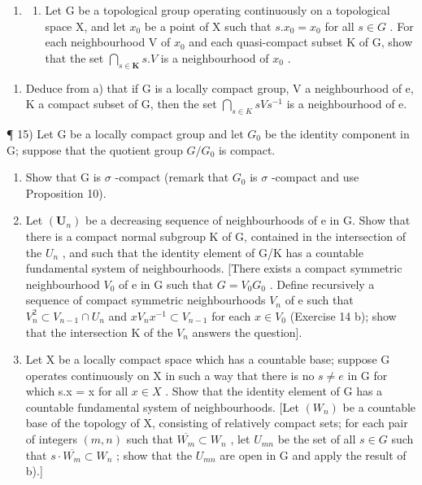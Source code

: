 \begin{enumerate}
\def\labelenumi{\arabic{enumi})}
\setcounter{enumi}{13}
\tightlist
\item
  \begin{enumerate}
  \def\labelenumii{\alph{enumii})}
  \tightlist
  \item
    Let G be a topological group operating continuously on a topological space X, and let \(x_0\) be a point of X such that \(s.x_0 = x_0\) for all \(s \in G\) . For each neighbourhood V of \(x_0\) and each quasi-compact subset K of G, show that the set \(\bigcap_{s \in \mathbf{K}} s.V\) is a neighbourhood of \(x_0\) .
  \end{enumerate}
\end{enumerate}

\begin{enumerate}
\def\labelenumi{\alph{enumi})}
\setcounter{enumi}{1}
\tightlist
\item
  Deduce from a) that if G is a locally compact group, V a neighbourhood of e, K a compact subset of G, then the set \(\bigcap_{s\in K}sVs^{-1}\) is a neighbourhood of e.
\end{enumerate}

¶ 15) Let G be a locally compact group and let \(G_{0}\) be the identity component in G; suppose that the quotient group \(G/G_{0}\) is compact.

\begin{enumerate}
\def\labelenumi{\alph{enumi})}
\item
  Show that G is \(\sigma\) -compact (remark that \(G_{0}\) is \(\sigma\) -compact and use Proposition 10).
\item
  Let \((\mathbf{U}_{n})\) be a decreasing sequence of neighbourhoods of e in G. Show that there is a compact normal subgroup K of G, contained in the intersection of the \(U_{n}\) , and such that the identity element of G/K has a countable fundamental system of neighbourhoods. {[}There exists a compact symmetric neighbourhood \(V_{0}\) of e in G such that \(G = V_{0}G_{0}\) . Define recursively a sequence of compact symmetric neighbourhoods \(V_{n}\) of e such that \(V_{n}^{2} \subset V_{n-1} \cap U_{n}\) and \(xV_{n}x^{-1} \subset V_{n-1}\) for each \(x \in V_{0}\) (Exercise 14 b); show that the intersection K of the \(V_{n}\) answers the question{]}.
\item
  Let X be a locally compact space which has a countable base; suppose G operates continuously on X in such a way that there is no \(s \neq e\) in G for which s.x = x for all \(x \in X\) . Show that the identity element of G has a countable fundamental system of neighbourhoods. {[}Let \((W_n)\) be a countable base of the topology of X, consisting of relatively compact sets; for each pair of integers \((m, n)\) such that \(\overline{W_m} \subset W_n\) , let \(U_{mn}\) be the set of all \(s \in G\) such that \(s \cdot \overline{W_m} \subset W_n\) ; show that the \(U_{mn}\) are open in G and apply the result of b).{]}
\end{enumerate}

